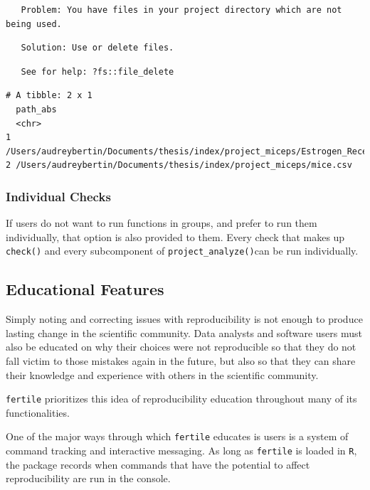 \documentclass[12pt,twoside]{reedthesis}
\begin{document}
\begin{verbatim}
   Problem: You have files in your project directory which are not being used.
\end{verbatim}
\begin{verbatim}
   Solution: Use or delete files.
\end{verbatim}
\begin{verbatim}
   See for help: ?fs::file_delete
\end{verbatim}
\begin{verbatim}
# A tibble: 2 x 1
  path_abs                                                                      
  <chr>                                                                         
1 /Users/audreybertin/Documents/thesis/index/project_miceps/Estrogen_Receptors.~
2 /Users/audreybertin/Documents/thesis/index/project_miceps/mice.csv            
\end{verbatim}
\subsubsection{Individual Checks}\label{individual-checks}

If users do not want to run functions in groups, and prefer to run them
individually, that option is also provided to them. Every check that
makes up \texttt{check()} and every subcomponent of
\texttt{project\_analyze()}can be run individually.

\subsection{Educational Features}\label{educational-features}

Simply noting and correcting issues with reproducibility is not enough
to produce lasting change in the scientific community. Data analysts and
software users must also be educated on why their choices were not
reproducible so that they do not fall victim to those mistakes again in
the future, but also so that they can share their knowledge and
experience with others in the scientific community.

\texttt{fertile} prioritizes this idea of reproducibility education
throughout many of its functionalities.

One of the major ways through which \texttt{fertile} educates is users
is a system of command tracking and interactive messaging. As long as
\texttt{fertile} is loaded in \texttt{R}, the package records when
commands that have the potential to affect reproducibility are run in
the console.
\end{document}
